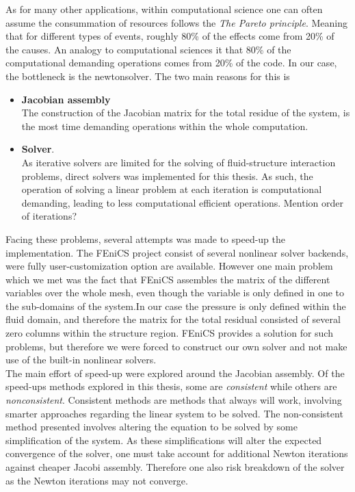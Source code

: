 As for many other applications, within computational science one can often assume the consummation of resources follows the \textit{The Pareto principle}. Meaning that for different types of events, roughly 80\% of the effects come from 20\% of the causes. An analogy to computational sciences it that 80\% of the computational demanding operations comes from 20\% of the code. In our case, the bottleneck is the newtonsolver. The two main reasons for this is 

\begin{itemize}
\item \textbf{Jacobian assembly} \\
The construction of the Jacobian matrix for the total residue of the system, is the most time demanding operations within the whole computation. 
\item \textbf{Solver}. \\ 
As iterative solvers are limited for the solving of fluid-structure interaction problems, direct solvers was implemented for this thesis. As such, the operation of solving a linear problem at each iteration is computational demanding, leading to  less computational efficient operations. Mention order of iterations?
\end{itemize}

Facing these problems, several attempts was made to speed-up the implementation. The FEniCS project consist of several nonlinear solver backends, were fully user-customization option are available. However one main problem which we met was the fact that FEniCS assembles the matrix of the different variables over the whole mesh, even though the variable is only defined in one to the sub-domains of the system.In our case the pressure is only defined within the fluid domain, and therefore the matrix for the total residual consisted of several zero columns within the structure region. FEniCS provides a solution for such problems, but therefore we were forced to construct our own solver and not make use of the built-in nonlinear solvers. \\

The main effort of speed-up were explored around the Jacobian assembly.
Of the speed-ups methods explored in this thesis, some are \textit{consistent} while others are \textit{nonconsistent}. Consistent methods are methods that always will work, involving smarter approaches regarding the linear system to be solved. The non-consistent method presented involves altering the equation to be solved by some simplification of the system. As these simplifications will alter the expected convergence of the solver, one must take account for additional Newton iterations against cheaper Jacobi assembly. Therefore one also risk breakdown of the solver as the Newton iterations may not converge.   


